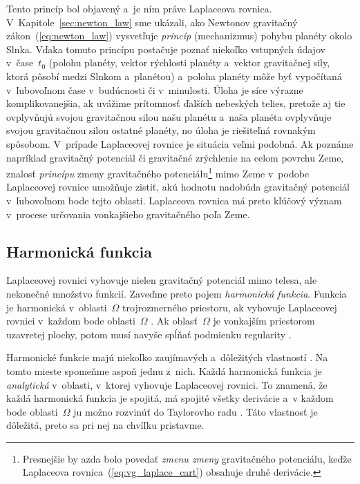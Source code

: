 \documentclass[a4paper, 12pt]{book}
\begin{document}
Tento princíp bol objavený a~je ním práve Laplaceova rovnica.  
V~Kapitole~\ref{sec:newton_law} sme ukázali, ako Newtonov gravitačný 
zákon~(\ref{eq:newton_law}) vysvetľuje \emph{princíp} (mechanizmus) pohybu 
planéty okolo Slnka.  Vďaka tomuto princípu postačuje poznať niekoľko vstupných 
údajov v~čase~$t_0$ (polohu planéty, vektor rýchlosti planéty a~vektor 
gravitačnej sily, ktorá pôsobí medzi Slnkom a~planétou) a~poloha planéty môže 
byť vypočítaná v~ľubovoľnom čase v~budúcnosti či v~minulosti.  Úloha je síce 
výrazne komplikovanejšia, ak uvážime prítomnosť ďalších nebeských telies, 
pretože aj tie ovplyvňujú svojou gravitačnou silou našu planétu a~naša planéta 
ovplyvňuje svojou gravitačnou silou ostatné planéty, no úloha je riešiteľná 
rovnakým spôsobom.  V~prípade Laplaceovej rovnice je situácia veľmi podobná.  
Ak poznáme napríklad gravitačný potenciál či gravitačné zrýchlenie na celom 
povrchu Zeme, znalosť \emph{princípu} zmeny gravitačného 
potenciálu\footnote{Presnejšie by azda bolo povedať \textit{zmenu zmeny} 
gravitačného potenciálu, keďže Laplaceova rovnica~(\ref{eq:vg_laplace_cart}) 
obsahuje druhé derivácie.} mimo Zeme v~podobe Laplaceovej rovnice umožňuje 
zistiť, akú hodnotu nadobúda gravitačný potenciál v~ľubovoľnom bode tejto 
oblasti.  Laplaceova rovnica má preto kľúčový význam v~procese určovania 
vonkajšieho gravitačného poľa Zeme.




\subsection{Harmonická funkcia}
\label{sec:harmonic_function}

Laplaceovej rovnici vyhovuje nielen gravitačný potenciál mimo telesa, ale
nekonečné množstvo funkcií.  Zaveďme preto pojem \emph{harmonická funkcia}.
Funkcia je harmonická v~oblasti~$\Omega$ trojrozmerného priestoru, ak vyhovuje 
Laplaceovej rovnici v~každom bode oblasti~$\Omega$ 
\parencite{MoritzPhysicalGeodesy}.  Ak oblasť~$\Omega$ je vonkajším priestorom 
uzavretej plochy, potom musí navyše spĺňať podmienku regularity 
\parencite[pozri vzťah~\ref{eq:regular_function};][]{MoritzPhysicalGeodesy}.

Harmonické funkcie majú niekoľko zaujímavých a~dôležitých vlastností 
\parencite[pozri napríklad][]{Pick1973,Kellogg1967,Janak2006}.  Na tomto mieste 
spomeňme aspoň jednu z~nich.  Každá harmonická funkcia je \emph{analytická} 
v~oblasti, v~ktorej vyhovuje
Laplaceovej rovnici.  To znamená, že každá
harmonická funkcia je spojitá, má spojité všetky derivácie a~v každom bode
oblasti~$\Omega$ ju možno rozvinúť do Taylorovho radu 
\parencite{MoritzPhysicalGeodesy}.  Táto vlastnosť je dôležitá, preto sa pri 
nej na chvíľku
pristavme.
\end{document}

